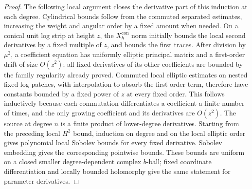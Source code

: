 \begin{proof}
The following local argument closes the derivative part of this induction
at each degree.  Cylindrical bounds follow from the
commuted separated estimates, increasing the weight and angular order
by a fixed amount when needed.  On a conical unit log strip at height
$z$, the $X^{\mathrm{con}}_h$ norm initially bounds the local second
derivatives by a fixed multiple of $z$, and bounds the first traces.
After division by $\mu^2$, a coefficient equation has uniformly elliptic
principal matrix and a first-order drift of size $O(z^2)$; all fixed
derivatives of its other coefficients are bounded by the family
regularity already proved.  Commuted local elliptic estimates on nested
fixed log patches, with interpolation to absorb the first-order term,
therefore have constants bounded by a fixed power of $z$ at every fixed
order.  This follows inductively because each commutation differentiates
a coefficient a finite number of times, and the only growing coefficient
and its derivatives are $O(z^2)$.  The source at degree $n$ is a finite
product of lower-degree derivatives.  Starting from the preceding local
$H^2$ bound, induction on degree and on the local elliptic order gives
polynomial local Sobolev bounds for every fixed derivative.  Sobolev
embedding gives the corresponding pointwise bounds.  These bounds are
uniform on a closed smaller degree-dependent complex $b$-ball; fixed
coordinate differentiation and locally bounded holomorphy give the
same statement for parameter derivatives.


\end{proof}
